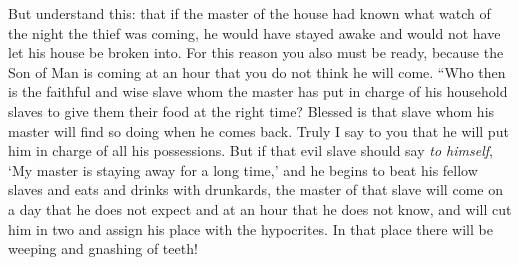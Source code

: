 \begin{biblechapter}
\verse But understand this: that if the master of the house had known what watch of the night the thief was coming, he would have stayed awake and would not have let his house be broken into.
\verse For this reason you also must be ready, because the Son of Man is coming at an hour that you do not think he will come.
 “Who then is the faithful and wise slave whom the master has put in charge of his household slaves to give them their food at the right time?
\verse Blessed is that slave whom his master will find so doing when he comes back.
\verse Truly I say to you that he will put him in charge of all his possessions.
\verse But if that evil slave should say \textit{to himself}, ‘My master is staying away for a long time,’
\verse and he begins to beat his fellow slaves and eats and drinks with drunkards,
\verse the master of that slave will come on a day that he does not expect and at an hour that he does not know,
\verse and will cut him in two and assign his place with the hypocrites. In that place there will be weeping and gnashing of teeth!
\end{biblechapter}

